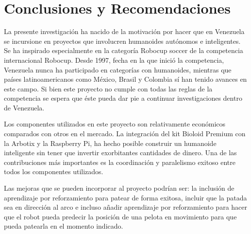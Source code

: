 \chapter{Conclusiones y Recomendaciones} \label{chapter:conclusiones}

\label{chap:conclusiones}

La presente investigación ha nacido de la motivación por hacer que en Venezuela se incursione en proyectos que involucren humanoides autónomos e inteligentes. Se ha inspirado especialmente en la categoría Robocup soccer de la competencia internacional Robocup. Desde 1997, fecha en la que inició la competencia, Venezuela nunca ha participado en categorías con humanoides, mientras que países latinoamericanos como México, Brasil y Colombia sí han tenido avances en este campo. Si bien este proyecto no cumple con todas las reglas de la competencia se espera que éste pueda dar pie a continuar investigaciones dentro de Venezuela.

Los componentes utilizados en este proyecto son relativamente económicos comparados con otros en el mercado. La integración del kit Bioloid Premium con la Arbotix y la Raspberry Pi, ha hecho posible construir un humanoide inteligente sin tener que invertir exorbitantes cantidades de dinero. Una de las contribuciones más importantes es la coordinación y paralelismo exitoso entre todos los componentes utilizados.

Las mejoras que se pueden incorporar al proyecto podrían ser: la inclusión de aprendizaje por reforzamiento para patear de forma exitosa, incluir que la patada sea en dirección al arco e incluso añadir aprendizaje por reforzamiento para hacer que el robot pueda predecir la posición de una pelota en movimiento para que pueda patearla en el momento indicado.



